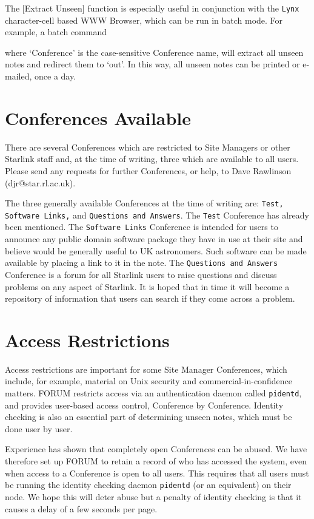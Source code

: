 \documentclass[twoside,11pt,nolof,noabs]{starlink}
\begin{document}
The [Extract Unseen] function is especially useful in conjunction with
the \texttt{Lynx} character-cell based WWW Browser, which can be run in
batch mode.    For example, a batch command

\begin{terminalv}
\end{terminalv}

where `Conference' is the case-sensitive Conference name, will extract
all unseen notes and redirect them to `out'.   In this way, all unseen
notes can be printed or e-mailed, once a day.

\section{Conferences Available}

There are several Conferences which are restricted to Site Managers or
other Starlink staff and, at the time of writing, three which are
available to all users.   Please send any requests for further
Conferences, or help, to Dave Rawlinson (djr@star.rl.ac.uk).

The three generally available Conferences at the time of writing are:
\texttt{Test, Software Links,} and \texttt{Questions and Answers}.  The
\texttt{Test} Conference has already been mentioned.
The \texttt{Software Links} Conference is intended for users to announce
any public domain software package they have in use at their site and
believe would be generally useful to UK astronomers.   Such software
can be made available by placing a link to it in the note.
The \texttt{Questions and Answers} Conference is a forum for all Starlink users
to raise questions and discuss problems on any aspect of Starlink.  It is
hoped that in time it will become a repository of information that
users can search if they come across a problem.

\section{\label{sec:access}Access Restrictions}

Access restrictions are important for some Site Manager Conferences,
which include, for example, material on Unix security and
commercial-in-confidence matters.  FORUM restricts access via an
authentication daemon called \texttt{pidentd}, and provides user-based
access control, Conference by Conference.  Identity checking is also an
essential part of determining unseen notes, which must be done user by
user.

Experience has shown that completely open Conferences can be abused.
We have therefore set up FORUM to retain a record of who has accessed
the system, even when access to a Conference is open to all users.
This requires that all users must be running the identity checking
daemon \texttt{pidentd} (or an equivalent) on their node.  We hope this
will deter abuse but  a penalty of identity checking is that it causes
a delay of a few seconds per page.
\end{document}
